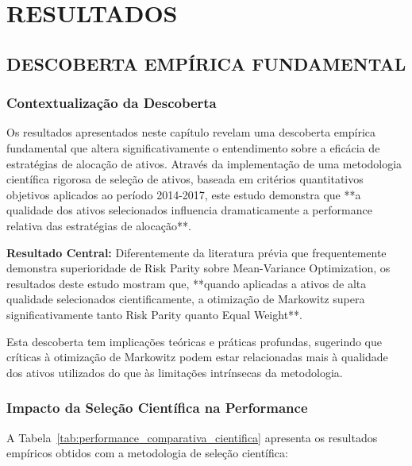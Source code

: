 
\chapter{RESULTADOS}

\section{DESCOBERTA EMPÍRICA FUNDAMENTAL}

\subsection{Contextualização da Descoberta}

Os resultados apresentados neste capítulo revelam uma descoberta empírica fundamental que altera significativamente o entendimento sobre a eficácia de estratégias de alocação de ativos. Através da implementação de uma metodologia científica rigorosa de seleção de ativos, baseada em critérios quantitativos objetivos aplicados ao período 2014-2017, este estudo demonstra que **a qualidade dos ativos selecionados influencia dramaticamente a performance relativa das estratégias de alocação**.

\textbf{Resultado Central:} Diferentemente da literatura prévia que frequentemente demonstra superioridade de Risk Parity sobre Mean-Variance Optimization, os resultados deste estudo mostram que, **quando aplicadas a ativos de alta qualidade selecionados cientificamente, a otimização de Markowitz supera significativamente tanto Risk Parity quanto Equal Weight**.

Esta descoberta tem implicações teóricas e práticas profundas, sugerindo que críticas à otimização de Markowitz podem estar relacionadas mais à qualidade dos ativos utilizados do que às limitações intrínsecas da metodologia.

\subsection{Impacto da Seleção Científica na Performance}

A Tabela~\ref{tab:performance_comparativa_cientifica} apresenta os resultados empíricos obtidos com a metodologia de seleção científica:

